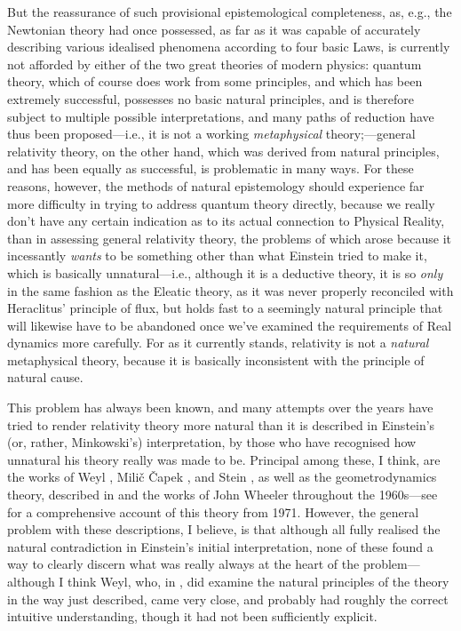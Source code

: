 But the reassurance of such provisional epistemological completeness, as, e.g., the Newtonian theory had once possessed, as far as it was capable of accurately describing various idealised phenomena according to four basic Laws, is currently not afforded by either of the two great theories of modern physics: quantum theory, which of course does work from some principles, and which has been extremely successful, possesses no basic natural principles, and is therefore subject to multiple possible interpretations, and many paths of reduction have thus been proposed---i.e., it is not a working \textit{metaphysical} theory;---general relativity theory, on the other hand, which was derived from natural principles, and has been equally as successful, is problematic in many ways. For these reasons, however, the methods of natural epistemology should experience far more difficulty in trying to address quantum theory directly, because we really don't have any certain indication as to its actual connection to Physical Reality, than in assessing general relativity theory, the problems of which arose because it incessantly \textit{wants} to be something other than what Einstein tried to make it, which is basically unnatural---i.e., although it is a deductive theory, it is so \textit{only} in the same fashion as the Eleatic theory, as it was never properly reconciled with Heraclitus' principle of flux, but holds fast to a seemingly natural principle that will likewise have to be abandoned once we've examined the requirements of Real dynamics more carefully. For as it currently stands, relativity is not a \textit{natural} metaphysical theory, because it is basically inconsistent with the principle of natural cause.

This problem has always been known, and many attempts over the years have tried to render relativity theory more natural than it is described in Einstein's (or, rather, Minkowski's) interpretation, by those who have recognised how unnatural his theory really was made to be. Principal among these, I think, are the works of Weyl \cite{Weyl1924}, Mili\v{c} \v{C}apek \cite{Capek1961}, and Stein \cite{Stein1968,Stein1991}, as well as the geometrodynamics theory, described in \cite{Witten1962,Arnowitt2008} and the works of John Wheeler throughout the 1960s---see \cite{Graves1971} for a comprehensive account of this theory from 1971. However, the general problem with these descriptions, I believe, is that although all fully realised the natural contradiction in Einstein's initial interpretation, none of these found a way to clearly discern what was really always at the heart of the problem---although I think Weyl, who, in \cite{Weyl1924}, did examine the natural principles of the theory in the way just described, came very close, and probably had roughly the correct intuitive understanding, though it had not been sufficiently explicit.


